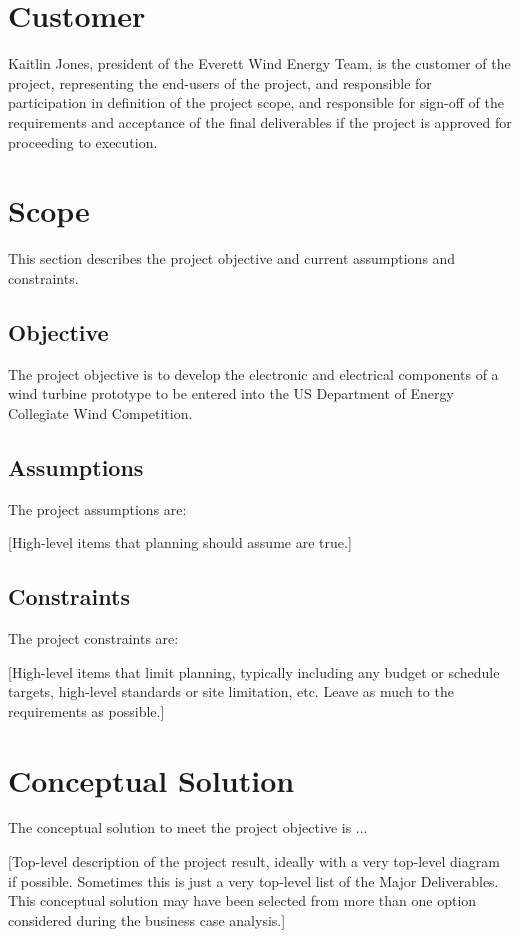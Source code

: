 \documentclass[11pt,letterpaper]{article}
\begin{document}
\section{Customer}
Kaitlin Jones, president of the Everett Wind Energy Team, is the customer of
the project, representing the end-users of the project, and responsible for participation in definition of the project scope, and responsible for sign-off of the requirements and acceptance of the final deliverables if the project is approved for proceeding to execution.

\section{Scope}
This section describes the project objective and current assumptions and constraints.

\subsection{Objective}
The project objective is to develop the electronic and electrical components
of a wind turbine prototype to be entered into the US Department of Energy
Collegiate Wind Competition.

\subsection{Assumptions}
The project assumptions are:

[High-level items that planning should assume are true.]

\subsection{Constraints}
The project constraints are:

[High-level items that limit planning, typically including any budget or schedule targets, high-level standards or site limitation, etc.  Leave as much to the requirements as possible.]

\section{Conceptual Solution}
The conceptual solution to meet the project objective is ...

    [Top-level description of the project result, ideally with a very top-level diagram if possible.  Sometimes this is just a very top-level list of the Major Deliverables.  This conceptual solution may have been selected from more than one option considered during the business case analysis.]
\end{document}
